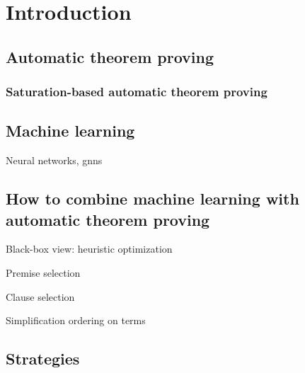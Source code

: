 \chapter{Introduction}



\section{Automatic theorem proving}

\subsection{Saturation-based automatic theorem proving}

\section{Machine learning}

Neural networks, \glspl{gnn}

\section{How to combine machine learning with automatic theorem proving}

Black-box view: heuristic optimization

Premise selection

Clause selection

Simplification ordering on terms

\section{Strategies}
